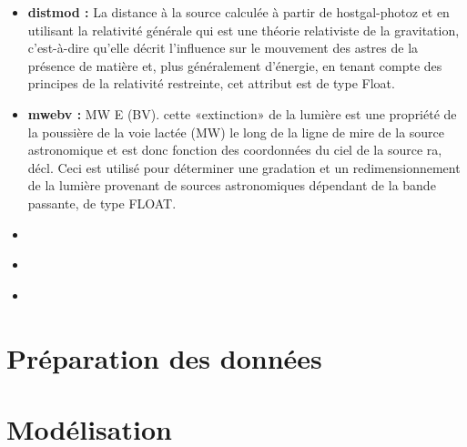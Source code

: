 \begin{itemize}
    \item \textbf{distmod :} La distance à la source calculée à partir de hostgal-photoz et en utilisant la relativité générale qui est une théorie relativiste de la gravitation, c’est-à-dire qu’elle décrit l’influence sur le mouvement des astres de la présence de matière et, plus généralement d’énergie, en tenant compte des principes de la relativité restreinte, cet attribut est de type Float.
    \item\textbf{mwebv :} MW E (BV). cette «extinction» de la lumière est une propriété de la poussière de la voie lactée (MW) le long de la ligne de mire de la source astronomique et est donc fonction des coordonnées du ciel de la source ra, décl. Ceci est utilisé pour déterminer une gradation et un redimensionnement de la lumière provenant de sources astronomiques dépendant de la bande passante, de type FLOAT.
    \item\textbf{}
    \item\textbf{}
    \item\textbf{}
\end{itemize}



















\section{Préparation des données}\label{sec:data_preparation}


\section{Modélisation}

